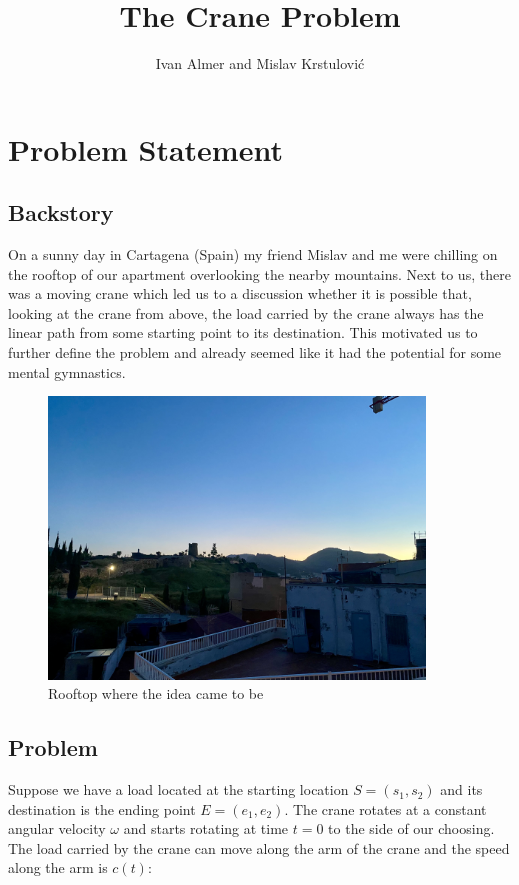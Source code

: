 \documentclass[11pt]{article}
\begin{document}
\title{The Crane Problem}
\author{Ivan Almer and Mislav Krstulović}

\maketitle

\section{Problem Statement}

\subsection{Backstory}
On a sunny day in Cartagena (Spain) my friend Mislav and me were chilling on the rooftop of our apartment overlooking the nearby mountains. Next to us, there was a moving crane which led us to a discussion whether it is possible that, looking at the crane from above, the load carried by the crane always has the linear path from some starting point to its destination.
This motivated us to further define the problem and already seemed like it had the potential for some mental gymnastics.

\begin{figure}[H]
\centering
\includegraphics[width=10cm]{img/rooftop.jpeg}
\caption{Rooftop where the idea came to be}\label{fig:rooftop}
\end{figure}

\subsection{Problem}
Suppose we have a load located at the starting location $S = (s_1,s_2)$ and its destination is the ending point $E = (e_1,e_2)$. The crane rotates at a constant angular velocity $\omega$ and starts rotating at time $t=0$ to the side of our choosing. The load carried by the crane can move along the arm of the crane and the speed along the arm is $c(t)$:
\end{document}

